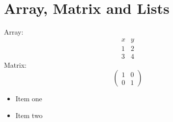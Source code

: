 \documentclass{article}
\begin{document}
\section{Array, Matrix and Lists}
Array:
\[
\begin{array}{c|c}
x & y\\ \hline
1 & 2\\
3 & 4
\end{array}
\]
Matrix:
\[
\begin{pmatrix}1&0\\0&1\end{pmatrix}
\]
\begin{itemize}
\item Item one
\item Item two
\end{itemize}
\end{document}
